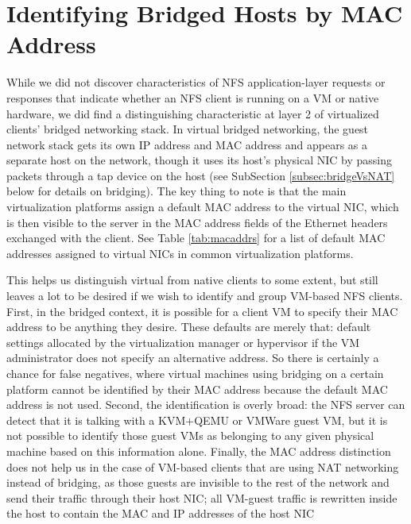 \documentclass[11pt,pdftex,twocolumn]{article}
\begin{document}
\section{Identifying Bridged Hosts by MAC Address}
\label{sec:macaddrs}
While we did not discover characteristics of NFS application-layer requests or responses that indicate whether an NFS client is running on a VM or native hardware, we did find a distinguishing characteristic at layer 2 of virtualized clients' bridged networking stack. In virtual bridged networking, the guest network stack gets its own IP address and MAC address and appears as a separate host on the network, though it uses its host's physical NIC by passing packets through a tap device on the host (see SubSection \ref{subsec:bridgeVsNAT} below for details on bridging). The key thing to note is that the main virtualization platforms assign a default MAC address to the virtual NIC, which is then visible to the server in the MAC address fields of the Ethernet headers exchanged with the client. See Table \ref{tab:macaddrs} for a list of default MAC addresses assigned to virtual NICs in common virtualization platforms. 

This helps us distinguish virtual from native clients to some extent, but still leaves a lot to be desired if we wish to identify and group VM-based NFS clients. First, in the bridged context, it is possible for a client VM to specify their MAC address to be anything they desire. These defaults are merely that: default settings allocated by the virtualization manager or hypervisor if the VM administrator does not specify an alternative address. So there is certainly a chance for false negatives, where virtual machines using bridging on a certain platform cannot be identified by their MAC address because the default MAC address is not used. Second, the identification is overly broad: the NFS server can detect that it is talking with a KVM+QEMU or VMWare guest VM, but it is not possible to identify those guest VMs as belonging to any given physical machine based on this information alone. Finally, the MAC address distinction does not help us in the case of VM-based clients that are using NAT networking instead of bridging, as those guests are invisible to the rest of the network and send their traffic through their host NIC; all VM-guest traffic is rewritten inside the host to contain the MAC and IP addresses of the host NIC
\end{document}
